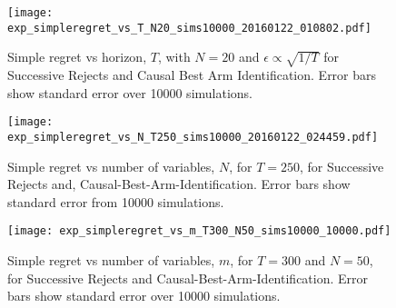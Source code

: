 \begin{figure}
\caption{Simple regret vs horizon, $T$, with $N = 20$ and $\epsilon \propto \sqrt{1/T}$ for Successive Rejects and Causal Best Arm Identification. Error bars show standard error over 10000 simulations.}
\label{fig:simple_vs_T_vary_epsilon}
\centering
\texttt{[image: exp\_simpleregret\_vs\_T\_N20\_sims10000\_20160122\_010802.pdf]}
\end{figure}

\begin{figure}
\caption{Simple regret vs number of variables, $N$, for $T=250$, for Successive Rejects and, Causal-Best-Arm-Identification. Error bars show standard error from 10000 simulations.}
\label{fig:simple_vs_N}
\centering
\texttt{[image: exp\_simpleregret\_vs\_N\_T250\_sims10000\_20160122\_024459.pdf]}
\end{figure}


\begin{figure}
\caption{Simple regret vs number of variables, $m$, for $T=300$ and $N = 50$, for Successive Rejects and Causal-Best-Arm-Identification. Error bars show standard error over 10000 simulations.}
\label{fig:simple_vs_m}
\centering
\texttt{[image: exp\_simpleregret\_vs\_m\_T300\_N50\_sims10000\_10000.pdf]}
\end{figure}
